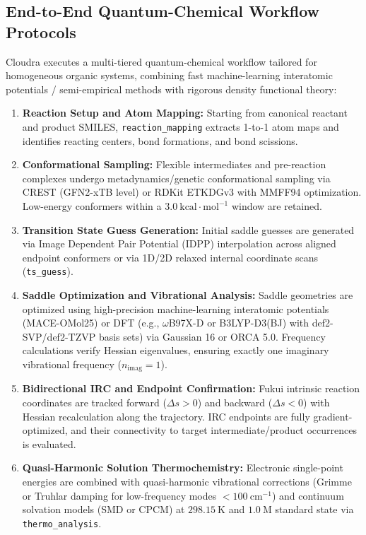 \documentclass[10pt,twocolumn,letterpaper]{article}
\begin{document}
\subsection{End-to-End Quantum-Chemical Workflow Protocols}
Cloudra executes a multi-tiered quantum-chemical workflow tailored for homogeneous organic systems, combining fast machine-learning interatomic potentials / semi-empirical methods with rigorous density functional theory:
\begin{enumerate}[leftmargin=*]
\item \textbf{Reaction Setup and Atom Mapping:} Starting from canonical reactant and product SMILES, \texttt{reaction\_mapping} extracts 1-to-1 atom maps and identifies reacting centers, bond formations, and bond scissions.
\item \textbf{Conformational Sampling:} Flexible intermediates and pre-reaction complexes undergo metadynamics/genetic conformational sampling via CREST (GFN2-xTB level) \cite{grimme2019crest} or RDKit ETKDGv3 with MMFF94 optimization. Low-energy conformers within a $3.0\ \mathrm{kcal\cdot mol^{-1}}$ window are retained.
\item \textbf{Transition State Guess Generation:} Initial saddle guesses are generated via Image Dependent Pair Potential (IDPP) interpolation \cite{smidstrup2014idpp} across aligned endpoint conformers or via 1D/2D relaxed internal coordinate scans (\texttt{ts\_guess}).
\item \textbf{Saddle Optimization and Vibrational Analysis:} Saddle geometries are optimized using high-precision machine-learning interatomic potentials (MACE-OMol25) or DFT (e.g., $\omega$B97X-D or B3LYP-D3(BJ) with def2-SVP/def2-TZVP basis sets) via Gaussian 16 or ORCA 5.0. Frequency calculations verify Hessian eigenvalues, ensuring exactly one imaginary vibrational frequency ($n_\mathrm{imag} = 1$).
\item \textbf{Bidirectional IRC and Endpoint Confirmation:} Fukui intrinsic reaction coordinates \cite{fukui1981irc} are tracked forward ($\Delta s > 0$) and backward ($\Delta s < 0$) with Hessian recalculation along the trajectory. IRC endpoints are fully gradient-optimized, and their connectivity to target intermediate/product occurrences is evaluated.
\item \textbf{Quasi-Harmonic Solution Thermochemistry:} Electronic single-point energies are combined with quasi-harmonic vibrational corrections (Grimme or Truhlar damping for low-frequency modes $< 100\ \mathrm{cm^{-1}}$) \cite{grimme2012goodvibes} and continuum solvation models (SMD or CPCM) at $298.15\ \mathrm{K}$ and $1.0\ \mathrm{M}$ standard state via \texttt{thermo\_analysis}.
\end{enumerate}
\end{document}
